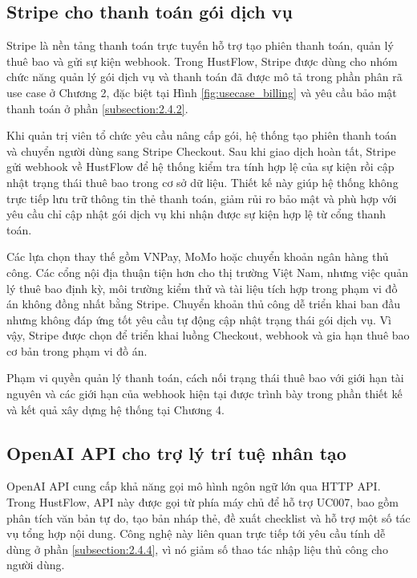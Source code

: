 \documentclass[../DoAn.tex]{subfiles}
\begin{document}
\subsection{Stripe cho thanh toán gói dịch vụ}
\label{subsection:3.2.5}

Stripe \cite{stripe} là nền tảng thanh toán trực tuyến hỗ trợ tạo phiên thanh toán, quản lý thuê bao và gửi sự kiện webhook. Trong HustFlow, Stripe được dùng cho nhóm chức năng quản lý gói dịch vụ và thanh toán đã được mô tả trong phần phân rã use case ở Chương 2, đặc biệt tại Hình \ref{fig:usecase_billing} và yêu cầu bảo mật thanh toán ở phần \ref{subsection:2.4.2}.

Khi quản trị viên tổ chức yêu cầu nâng cấp gói, hệ thống tạo phiên thanh toán và chuyển người dùng sang Stripe Checkout. Sau khi giao dịch hoàn tất, Stripe gửi webhook về HustFlow để hệ thống kiểm tra tính hợp lệ của sự kiện rồi cập nhật trạng thái thuê bao trong cơ sở dữ liệu. Thiết kế này giúp hệ thống không trực tiếp lưu trữ thông tin thẻ thanh toán, giảm rủi ro bảo mật và phù hợp với yêu cầu chỉ cập nhật gói dịch vụ khi nhận được sự kiện hợp lệ từ cổng thanh toán.

Các lựa chọn thay thế gồm VNPay, MoMo hoặc chuyển khoản ngân hàng thủ công. Các cổng nội địa thuận tiện hơn cho thị trường Việt Nam, nhưng việc quản lý thuê bao định kỳ, môi trường kiểm thử và tài liệu tích hợp trong phạm vi đồ án không đồng nhất bằng Stripe. Chuyển khoản thủ công dễ triển khai ban đầu nhưng không đáp ứng tốt yêu cầu tự động cập nhật trạng thái gói dịch vụ. Vì vậy, Stripe được chọn để triển khai luồng Checkout, webhook và gia hạn thuê bao cơ bản trong phạm vi đồ án.

Phạm vi quyền quản lý thanh toán, cách nối trạng thái thuê bao với giới hạn tài nguyên và các giới hạn của webhook hiện tại được trình bày trong phần thiết kế và kết quả xây dựng hệ thống tại Chương 4.

\subsection{OpenAI API cho trợ lý trí tuệ nhân tạo}
\label{subsection:3.2.6}

OpenAI API \cite{openai} cung cấp khả năng gọi mô hình ngôn ngữ lớn qua HTTP API. Trong HustFlow, API này được gọi từ phía máy chủ để hỗ trợ UC007, bao gồm phân tích văn bản tự do, tạo bản nháp thẻ, đề xuất checklist và hỗ trợ một số tác vụ tổng hợp nội dung. Công nghệ này liên quan trực tiếp tới yêu cầu tính dễ dùng ở phần \ref{subsection:2.4.4}, vì nó giảm số thao tác nhập liệu thủ công cho người dùng.
\end{document}
